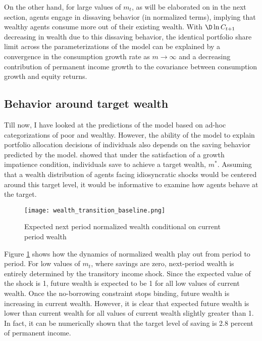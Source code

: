On the other hand, for large values of $m_{t}$, as will be elaborated on in the next section, agents engage in dissaving behavior (in normalized terms), implying that wealthy agents consume more out of their existing wealth. With $\D\ln C_{t+1}$ decreasing in wealth due to this dissaving behavior, the identical portfolio share limit across the parameterizations of the model can be explained by a convergence in the consumption growth rate as $m \to \infty$ and a decreasing contribution of permanent income growth to the covariance between consumption growth and equity returns.

\subsection{Behavior around target wealth}\label{target_wealth}

Till now, I have looked at the predictions of the model based on ad-hoc categorizations of poor and wealthy. However, the ability of the model to explain portfolio allocation decisions of individuals also depends on the saving behavior predicted by the model. \citet{Deaton1991} showed that under the satisfaction of a growth impatience condition, individuals save to achieve a target wealth, $m^*$. Assuming that a wealth distribution of agents facing idiosyncratic shocks would be centered around this target level, it would be informative to examine how agents behave at the target.
\begin{figure}[h]
    \centering
    \texttt{[image: wealth\_transition\_baseline.png]}
    \caption{Expected next period normalized wealth conditional on current period wealth}
    \label{fig:wealth_transition}
\end{figure}
Figure \ref{fig:wealth_transition} shows how the dynamics of normalized wealth play out from period to period. For low values of $m_{t}$, where savings are zero, next-period wealth is entirely determined by the transitory income shock. Since the expected value of the shock is 1, future wealth is expected to be 1 for all low values of current wealth. Once the no-borrowing constraint stops binding, future wealth is increasing in current wealth. However, it is clear that expected future wealth is lower than current wealth for all values of current wealth slightly greater than 1. In fact, it can be numerically shown that the target level of saving is 2.8 percent of permanent income.

